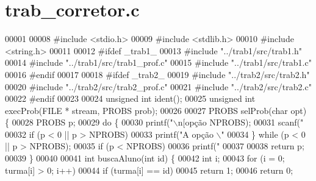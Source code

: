 \section{trab\+\_\+corretor.\+c}
\label{trab__corretor_8c_source}

\begin{DoxyCode}
00001 
00008 \textcolor{preprocessor}{#include <stdio.h>}
00009 \textcolor{preprocessor}{#include <stdlib.h>}
00010 \textcolor{preprocessor}{#include <string.h>}
00011 
00012 \textcolor{preprocessor}{#ifdef \_trab1\_}
00013 \textcolor{preprocessor}{#include "../trab1/src/trab1.h"}
00014 \textcolor{preprocessor}{#include "../trab1/src/trab1\_prof.c"}
00015 \textcolor{preprocessor}{#include "../trab1/src/trab1.c"}
00016 \textcolor{preprocessor}{#endif}
00017 
00018 \textcolor{preprocessor}{#ifdef \_trab2\_}
00019 \textcolor{preprocessor}{#include "../trab2/src/trab2.h"}
00020 \textcolor{preprocessor}{#include "../trab2/src/trab2\_prof.c"}
00021 \textcolor{preprocessor}{#include "../trab2/src/trab2.c"}
00022 \textcolor{preprocessor}{#endif}
00023 
00024 \textcolor{keywordtype}{unsigned} \textcolor{keywordtype}{int} ident();
00025 \textcolor{keywordtype}{unsigned} \textcolor{keywordtype}{int} execProb(FILE * stream, PROBS prob);
00026 
00027 PROBS selProb(\textcolor{keywordtype}{char} opt) \{
00028         PROBS p;
00029         \textcolor{keywordflow}{do} \{
00030                 printf(\textcolor{stringliteral}{"\(\backslash\)n[opção %
      NPROBS);
00031                 scanf(\textcolor{stringliteral}{"%
00032                 \textcolor{keywordflow}{if} (p < 0 || p > NPROBS)
00033                         printf(\textcolor{stringliteral}{"A opção \(\backslash\)"%
00034         \} \textcolor{keywordflow}{while} (p < 0 || p > NPROBS);
00035         \textcolor{keywordflow}{if} (p < NPROBS)
00036                 printf(\textcolor{stringliteral}{"%
00037 
00038         \textcolor{keywordflow}{return} p;
00039 \}
00040 
00041 \textcolor{keywordtype}{int} buscaAluno(\textcolor{keywordtype}{int} \textcolor{keywordtype}{id}) \{
00042         \textcolor{keywordtype}{int} i;
00043         \textcolor{keywordflow}{for} (i = 0; turma[i] > 0; i++)
00044                 \textcolor{keywordflow}{if} (turma[i] == \textcolor{keywordtype}{id})
00045                         \textcolor{keywordflow}{return} 1;
00046         \textcolor{keywordflow}{return} 0;
}}}}
\end{DoxyCode}

